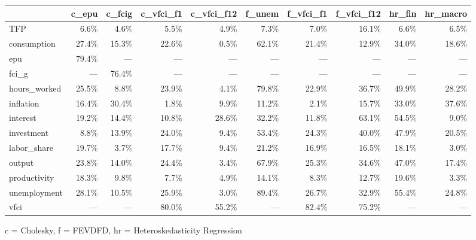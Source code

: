 
\fontsize{12.0pt}{14.4pt}\selectfont
\begin{tabular*}{\linewidth}{@{\extracolsep{\fill}}l|rrrrrrrrr}
\toprule
 & c\_epu & c\_fcig & c\_vfci\_f1 & c\_vfci\_f12 & f\_unem & f\_vfci\_f1 & f\_vfci\_f12 & hr\_fin & hr\_macro \\ 
\midrule\addlinespace[2.5pt]
TFP & 6.6\% & 4.6\% & 5.5\% & 4.9\% & 7.3\% & 7.0\% & 16.1\% & 6.6\% & 6.5\% \\ 
consumption & 27.4\% & 15.3\% & 22.6\% & 0.5\% & 62.1\% & 21.4\% & 12.9\% & 34.0\% & 18.6\% \\ 
epu & 79.4\% & — & — & — & — & — & — & — & — \\ 
fci\_g & — & 76.4\% & — & — & — & — & — & — & — \\ 
hours\_worked & 25.5\% & 8.8\% & 23.9\% & 4.1\% & 79.8\% & 22.9\% & 36.7\% & 49.9\% & 28.2\% \\ 
inflation & 16.4\% & 30.4\% & 1.8\% & 9.9\% & 11.2\% & 2.1\% & 15.7\% & 33.0\% & 37.6\% \\ 
interest & 19.2\% & 14.4\% & 10.8\% & 28.6\% & 32.2\% & 11.8\% & 63.1\% & 54.5\% & 9.0\% \\ 
investment & 8.8\% & 13.9\% & 24.0\% & 9.4\% & 53.4\% & 24.3\% & 40.0\% & 47.9\% & 20.5\% \\ 
labor\_share & 19.7\% & 3.7\% & 17.7\% & 9.4\% & 21.2\% & 16.9\% & 16.5\% & 18.1\% & 3.0\% \\ 
output & 23.8\% & 14.0\% & 24.4\% & 3.4\% & 67.9\% & 25.3\% & 34.6\% & 47.0\% & 17.4\% \\ 
productivity & 18.3\% & 9.8\% & 7.7\% & 4.9\% & 14.1\% & 8.3\% & 12.7\% & 19.6\% & 3.3\% \\ 
unemployment & 28.1\% & 10.5\% & 25.9\% & 3.0\% & 89.4\% & 26.7\% & 32.9\% & 55.4\% & 24.8\% \\ 
vfci & — & — & 80.0\% & 55.2\% & — & 82.4\% & 75.2\% & — & — \\ 
\bottomrule
\end{tabular*}
\begin{minipage}{\linewidth}
c = Cholesky, f = FEVDFD, hr = Heteroskedasticity Regression\\
\end{minipage}


